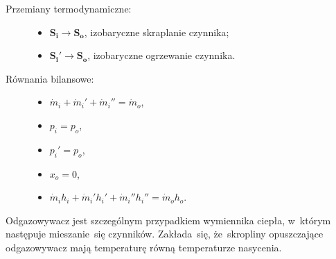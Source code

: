 \begin{description}

	\item[Przemiany termodynamiczne:] \hfill

		\begin{itemize}

			\item $\mathbf{S_i} \rightarrow \mathbf{S_o}$,
				izobaryczne skraplanie czynnika;

			\item $\mathbf{S_i'} \rightarrow \mathbf{S_o}$,
				izobaryczne ogrzewanie czynnika.

		\end{itemize}

	\item[Równania bilansowe:] \hfill

		\begin{itemize}

			\item \eq$\dot m_i + \dot m_i' + \dot m_i'' = \dot m_o$,

			\item \eq$p_i = p_o$,

			\item \eq$p_i' = p_o$,

			\item \eq$x_o = 0$,%
				\label{regen-x0}

			\item \eq$\dot m_i h_i + \dot m_i' h_i' + \dot m_i'' h_i''
				= \dot m_o h_o$.

		\end{itemize}

\end{description}

Odgazowywacz jest szczególnym przypadkiem wymiennika ciepła, w~którym
następuje mieszanie~się czynników. Zakłada~się, że~skropliny
opuszczające odgazowywacz mają temperaturę równą temperaturze nasycenia.
